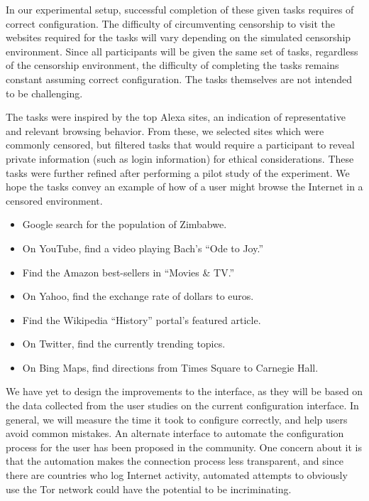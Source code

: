 \documentclass{template}
\begin{document}
In our experimental setup, successful completion of 
these given tasks requires of correct configuration.
The difficulty of circumventing  censorship to visit the 
websites required for the tasks will vary depending on the 
simulated censorship environment. Since all participants will be given the 
same set of tasks, regardless of the censorship environment, 
the difficulty of completing the tasks remains constant assuming
correct configuration. The tasks themselves are not intended to
be challenging.

The tasks were inspired by the top Alexa sites,
an indication of representative and relevant browsing behavior. 
From these, we selected sites which were commonly censored, 
but filtered tasks that would require a participant to reveal private information 
(such as login information) for ethical considerations. These tasks
were further refined after performing a pilot study of the experiment. 
We hope the tasks convey an example of how of a user might 
browse the Internet in a censored environment. 

\begin{itemize} \itemsep1pt \parskip0pt 
\item Google search for the population of Zimbabwe. 
\item On YouTube, find a video playing Bach's ``Ode to Joy.''
\item Find the Amazon best-sellers in ``Movies \& TV.''
\item On Yahoo, find the exchange rate of dollars to euros.
\item Find the Wikipedia ``History'' portal's featured article. 
\item On Twitter, find the currently trending topics.
\item On Bing Maps, find directions from Times Square to Carnegie Hall.\\
\end{itemize}

 We have yet to design the 
improvements to the interface, as they will be based on the data collected from 
the user studies on the current configuration interface. In general, we will measure the 
time it took to configure correctly, and help users avoid common mistakes. An alternate 
interface to automate the configuration process for the user has been proposed in the 
community. One concern about it is that the automation makes the connection process less transparent, 
and since there are countries who log Internet activity, automated attempts to obviously
use the Tor network could have the potential to be incriminating.\\
\end{document}
